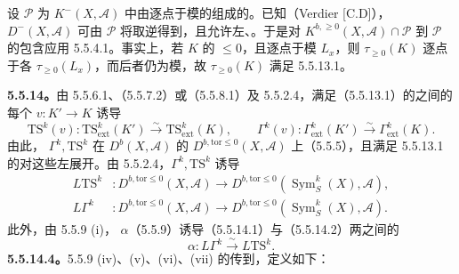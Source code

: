 设 $\mathscr P$ 为 $K^-(X,\mathscr A)$ 中由逐点于模的组成的。已知（Verdier [C.D]），$D^-(X,\mathscr A)$ 可由 $\mathscr P$ 将取逆得到，且允许左、。于是对 $K^{b,\geq0}(X,\mathscr A)\cap\mathscr P$ 到 $\mathscr P$ 的包含应用 5.5.4.1。事实上，若 $K$ 的  $\leq0$，且逐点于模 $L_x$，则 $\tau_{\geq0}(K)$ 逐点于各 $\tau_{\geq0}(L_x)$，而后者仍为模，故 $\tau_{\geq0}(K)$ 满足 5.5.13.1。

\textbf{5.5.14。}由 5.5.6.1、（5.5.7.2）或（5.5.8.1）及 5.5.2.4，满足（5.5.13.1）的之间的每个 $v:K'\to K$ 诱导
\[\mathrm{TS}^k(v):\mathrm{TS}^k_{\mathrm{ext}}(K')\xrightarrow\sim\mathrm{TS}^k_{\mathrm{ext}}(K),\qquad
\Gamma^k(v):\Gamma^k_{\mathrm{ext}}(K')\xrightarrow\sim\Gamma^k_{\mathrm{ext}}(K).\]
由此， $\Gamma^k,\mathrm{TS}^k$ 在 $D^b(X,\mathscr A)$ 的 $D^{b,\mathrm{tor}\leq0}(X,\mathscr A)$ 上（5.5.5），且满足 5.5.13.1 的对这些左展开。由 5.5.2.4，$\Gamma^k,\mathrm{TS}^k$ 诱导
\begin{align}
L\mathrm{TS}^k &:D^{b,\mathrm{tor}\leq0}(X,\mathscr A)\longrightarrow D^{b,\mathrm{tor}\leq0}(\operatorname{Sym}^k_S(X),\mathscr A),\tag{5.5.14.1}\\
L\Gamma^k &:D^{b,\mathrm{tor}\leq0}(X,\mathscr A)\longrightarrow D^{b,\mathrm{tor}\leq0}(\operatorname{Sym}^k_S(X),\mathscr A).\tag{5.5.14.2}
\end{align}
此外，由 5.5.9 (i)， $\alpha$（5.5.9）诱导（5.5.14.1）与（5.5.14.2）两之间的
\begin{equation}\tag{5.5.14.3}\alpha:L\Gamma^k\xrightarrow\sim L\mathrm{TS}^k.\end{equation}
\textbf{5.5.14.4。}5.5.9 (iv)、(v)、(vi)、(vii) 的传到，定义如下：

